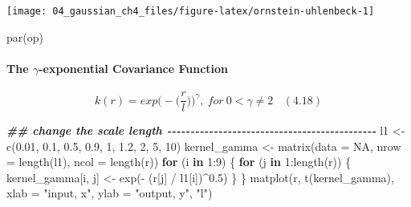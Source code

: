 \documentclass[
]{article}
\newenvironment{Shaded}{\begin{snugshade}}{\end{snugshade}}
\newcommand{\AttributeTok}[1]{\textcolor[rgb]{0.77,0.63,0.00}{#1}}
\newcommand{\ConstantTok}[1]{\textcolor[rgb]{0.00,0.00,0.00}{#1}}
\newcommand{\ControlFlowTok}[1]{\textcolor[rgb]{0.13,0.29,0.53}{\textbf{#1}}}
\newcommand{\DecValTok}[1]{\textcolor[rgb]{0.00,0.00,0.81}{#1}}
\newcommand{\DocumentationTok}[1]{\textcolor[rgb]{0.56,0.35,0.01}{\textbf{\textit{#1}}}}
\newcommand{\FloatTok}[1]{\textcolor[rgb]{0.00,0.00,0.81}{#1}}
\newcommand{\FunctionTok}[1]{\textcolor[rgb]{0.00,0.00,0.00}{#1}}
\newcommand{\NormalTok}[1]{#1}
\newcommand{\OtherTok}[1]{\textcolor[rgb]{0.56,0.35,0.01}{#1}}
\newcommand{\SpecialCharTok}[1]{\textcolor[rgb]{0.00,0.00,0.00}{#1}}
\newcommand{\StringTok}[1]{\textcolor[rgb]{0.31,0.60,0.02}{#1}}
\begin{document}
\begin{center}\texttt{[image: 04\_gaussian\_ch4\_files/figure-latex/ornstein-uhlenbeck-1]} \end{center}

\begin{Shaded}
\begin{Highlighting}[]
\FunctionTok{par}\NormalTok{(op)}
\end{Highlighting}
\end{Shaded}

\hypertarget{the-gamma-exponential-covariance-function}{%
\paragraph{\texorpdfstring{The \(\gamma\)-exponential Covariance
Function}{The \textbackslash gamma-exponential Covariance Function}}\label{the-gamma-exponential-covariance-function}}

\[
k(r) = exp\Big( - \big(\frac r l\big) \Big)^\gamma,\  for\  0 < \gamma \neq 2
\ \ \ \ (4.18)
\]

\begin{Shaded}
\begin{Highlighting}[]
\DocumentationTok{\#\# change the scale length {-}{-}{-}{-}{-}{-}{-}{-}{-}{-}{-}{-}{-}{-}{-}{-}{-}{-}{-}{-}{-}{-}{-}{-}{-}{-}{-}{-}{-}{-}{-}{-}{-}{-}{-}{-}{-}{-}{-}{-}{-}{-}{-}{-}{-}}
\NormalTok{l1 }\OtherTok{\textless{}{-}} \FunctionTok{c}\NormalTok{(}\FloatTok{0.01}\NormalTok{, }\FloatTok{0.1}\NormalTok{,  }\FloatTok{0.5}\NormalTok{,}
         \FloatTok{0.9}\NormalTok{,   }\DecValTok{1}\NormalTok{,  }\FloatTok{1.2}\NormalTok{, }
           \DecValTok{2}\NormalTok{,   }\DecValTok{5}\NormalTok{,  }\DecValTok{10}\NormalTok{)}
\NormalTok{kernel\_gamma }\OtherTok{\textless{}{-}} \FunctionTok{matrix}\NormalTok{(}\AttributeTok{data =} \ConstantTok{NA}\NormalTok{, }\AttributeTok{nrow =} \FunctionTok{length}\NormalTok{(l1), }\AttributeTok{ncol =} \FunctionTok{length}\NormalTok{(r))}
\ControlFlowTok{for}\NormalTok{ (i }\ControlFlowTok{in} \DecValTok{1}\SpecialCharTok{:}\DecValTok{9}\NormalTok{) \{}
  \ControlFlowTok{for}\NormalTok{ (j }\ControlFlowTok{in} \DecValTok{1}\SpecialCharTok{:}\FunctionTok{length}\NormalTok{(r)) \{}
\NormalTok{    kernel\_gamma[i, j] }\OtherTok{\textless{}{-}} \FunctionTok{exp}\NormalTok{(}\SpecialCharTok{{-}}\NormalTok{ (r[j] }\SpecialCharTok{/}\NormalTok{ l1[i])}\SpecialCharTok{\^{}}\FloatTok{0.5}\NormalTok{) }
\NormalTok{  \}}
\NormalTok{\}}
\FunctionTok{matplot}\NormalTok{(r, }\FunctionTok{t}\NormalTok{(kernel\_gamma), }
        \AttributeTok{xlab =} \StringTok{"input, x"}\NormalTok{, }\AttributeTok{ylab =} \StringTok{"output, y"}\NormalTok{, }\StringTok{"l"}\NormalTok{)}
\end{Highlighting}
\end{Shaded}
\end{document}
